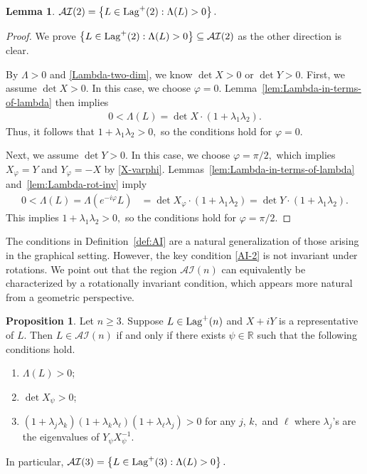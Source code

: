 \documentclass[11pt]{amsart}
\numberwithin{equation}{section}
\theoremstyle{definition}
\theoremstyle{definition}
\newtheorem{prop}[equation]{Proposition} %
\newtheorem{lemma}[equation]{Lemma}
\newcommand{\set}[1]{\left\{#1\right\}}
\newcommand{\pr}[1]{\left(#1\right)}
\newcommand{\bb}[1]{\mathbb{#1}} \newcommand{\td}[1]{\widetilde{#1}}
\newcommand{\sbst}{\subseteq}
\begin{document}
\begin{lemma}
	$\mathcal{AI}(2) 
	= \set{L\in{\rm Lag}^+(2): \Lambda(L)>0}.$
\end{lemma}


\begin{proof}
	We prove $\set{L\in{\rm Lag}^+(2): \Lambda(L)>0}\sbst \mathcal{AI}(2)$ as the other direction is clear.
	
	By $\Lambda>0$ and \eqref{Lambda-two-dim}, we know $\det X>0$ or $\det Y>0.$
	First, we assume $\det X>0.$
	In this case, we choose $\varphi=0.$ 
	Lemma~\ref{lem:Lambda-in-terms-of-lambda} then implies
	\begin{align*}
	0<\Lambda(L)
	= \det X \cdot \pr{1+\lambda_1\lambda_2}.
	\end{align*}
	Thus, it follows that  $1+\lambda_1\lambda_2>0,$
	so the conditions hold for $\varphi=0.$
	
	Next, we assume $\det Y>0.$
	In this case, we choose $\varphi=\pi/2,$ which implies
	$X_\varphi=Y$ and $Y_\varphi = -X$
	by \eqref{X-varphi}.
	Lemmas~\ref{lem:Lambda-in-terms-of-lambda} and~\ref{lem:Lambda-rot-inv} imply
	\begin{align*}
	0<\Lambda(L)
	= \Lambda\pr{e^{-i\varphi}L}
	& = \det X_\varphi \cdot \pr{1+\lambda_1\lambda_2}
	= \det Y \cdot \pr{1+\lambda_1\lambda_2}.
	\end{align*}
	This implies $1+\lambda_1\lambda_2>0,$ so the conditions hold for $\varphi=\pi/2.$
\end{proof}





The conditions in Definition~\ref{def:AI} are a natural generalization of those arising in the graphical setting. 
However, the key condition \eqref{AI-2} is not invariant under rotations. 
We point out that the region $\mathcal{AI}(n)$ can equivalently be characterized by a rotationally invariant condition, which appears more natural from a geometric perspective.


\begin{prop}
	\label{prop:AI-characterization}
	Let $n\ge 3.$
	Suppose $L\in{\rm Lag}^+(n)$ and  $X+iY$ is a representative of $L.$
	Then $L\in\mathcal{AI}(n)$ if and only if there exists $\psi\in\bb R$ such that the following conditions hold.
	\begin{enumerate}
		\item \label{AI-n-1}
		\(\Lambda(L)>0\);
		\item \label{AI-n-2}
		\(\det X_{\psi}>0\);
		\item \label{AI-n-3}
		$(1+\lambda_j\lambda_k)(1+\lambda_k\lambda_\ell)
		(1+\lambda_\ell\lambda_j)>0$
		for any $j$, $k,$ and $\ell$ where $\lambda_j$'s are the eigenvalues of $Y_\psi X_\psi^{-1}.$
	\end{enumerate}
	In particular, 
	$\mathcal{AI}(3) = \set{L\in{\rm Lag}^+(3): \Lambda(L)>0}.$
\end{prop}
\end{document}
